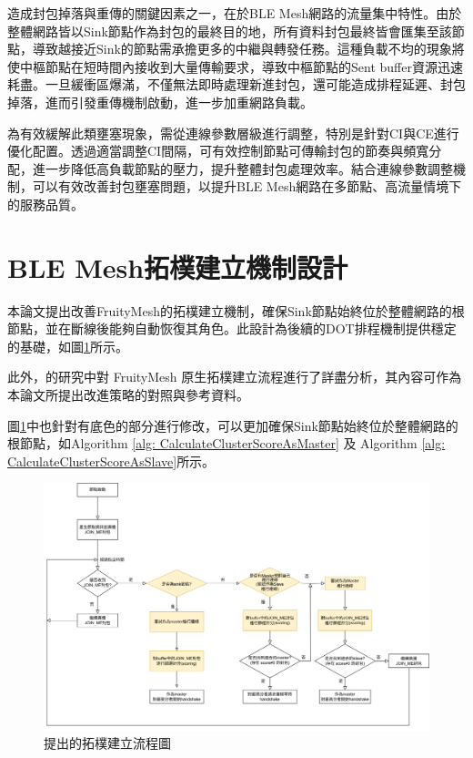\begin{ZhChapter}
造成封包掉落與重傳的關鍵因素之一，在於BLE Mesh網路的流量集中特性。由於整體網路皆以Sink節點作為封包的最終目的地，所有資料封包最終皆會匯集至該節點，導致越接近Sink的節點需承擔更多的中繼與轉發任務。這種負載不均的現象將使中樞節點在短時間內接收到大量傳輸要求，導致中樞節點的Sent buffer資源迅速耗盡。一旦緩衝區爆滿，不僅無法即時處理新進封包，還可能造成排程延遲、封包掉落，進而引發重傳機制啟動，進一步加重網路負載。

為有效緩解此類壅塞現象，需從連線參數層級進行調整，特別是針對CI與CE進行優化配置。透過適當調整CI間隔，可有效控制節點可傳輸封包的節奏與頻寬分配，進一步降低高負載節點的壓力，提升整體封包處理效率。結合連線參數調整機制，可以有效改善封包壅塞問題，以提升BLE Mesh網路在多節點、高流量情境下的服務品質。

\clearpage

\section{BLE Mesh拓樸建立機制設計}

本論文提出改善FruityMesh的拓樸建立機制，確保Sink節點始終位於整體網路的根節點，並在斷線後能夠自動恢復其角色。此設計為後續的DOT排程機制提供穩定的基礎，如圖\ref{fig: 提出的拓樸建立流程圖}所示。

此外，\cite{108TIT00392035}的研究中對 FruityMesh 原生拓樸建立流程進行了詳盡分析，其內容可作為本論文所提出改進策略的對照與參考資料。

圖\ref{fig: 提出的拓樸建立流程圖}中也針對有底色的部分進行修改，可以更加確保Sink節點始終位於整體網路的根節點，如Algorithm \ref{alg: CalculateClusterScoreAsMaster} 及 Algorithm \ref{alg: CalculateClusterScoreAsSlave}所示。

\begin{figure}[H]
    \centering
    \includegraphics[width = 1\textwidth]{image/build-up_pro2.png}
    \caption{提出的拓樸建立流程圖}
    \label{fig: 提出的拓樸建立流程圖}
\end{figure}


\end{ZhChapter}
